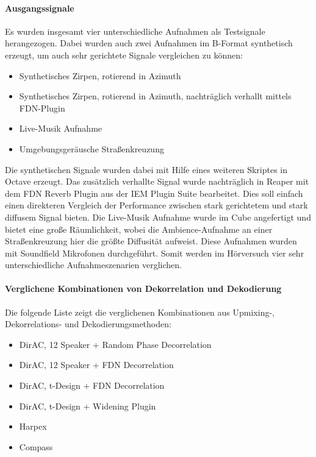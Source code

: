 \paragraph{Ausgangssignale}
Es wurden insgesamt vier unterschiedliche Aufnahmen als Testsignale herangezogen. Dabei wurden auch zwei Aufnahmen im B-Format synthetisch erzeugt, um auch sehr gerichtete Signale vergleichen zu können:

\begin{itemize}
	\item Synthetisches Zirpen, rotierend in Azimuth
	\item Synthetisches Zirpen, rotierend in Azimuth, nachträglich verhallt mittels FDN-Plugin
	\item Live-Musik Aufnahme
	\item Umgebungsgeräusche Straßenkreuzung
\end{itemize}

Die synthetischen Signale wurden dabei mit Hilfe eines weiteren Skriptes in Octave erzeugt. Das zusätzlich verhallte Signal wurde nachträglich in Reaper mit dem FDN Reverb Plugin aus der IEM Plugin Suite bearbeitet. Dies soll einfach einen direkteren Vergleich der Performance zwischen stark gerichtetem und stark diffusem Signal bieten. Die Live-Musik Aufnahme wurde im Cube angefertigt und bietet eine große Räumlichkeit, wobei die Ambience-Aufnahme an einer Straßenkreuzung hier die größte Diffusität aufweist. Diese Aufnahmen wurden mit Soundfield Mikrofonen durchgeführt. Somit werden im Hörversuch vier sehr unterschiedliche Aufnahmeszenarien verglichen.

\paragraph{Verglichene Kombinationen von Dekorrelation und Dekodierung}

Die folgende Liste zeigt die verglichenen Kombinationen aus Upmixing-, Dekorrelations- und Dekodierungsmethoden:

\begin{itemize}
	\item DirAC, 12 Speaker + Random Phase Decorrelation
	\item DirAC, 12 Speaker + FDN Decorrelation
	\item DirAC, t-Design + FDN Decorrelation
	\item DirAC, t-Design + Widening Plugin
	\item Harpex
	\item Compass
\end{itemize}


